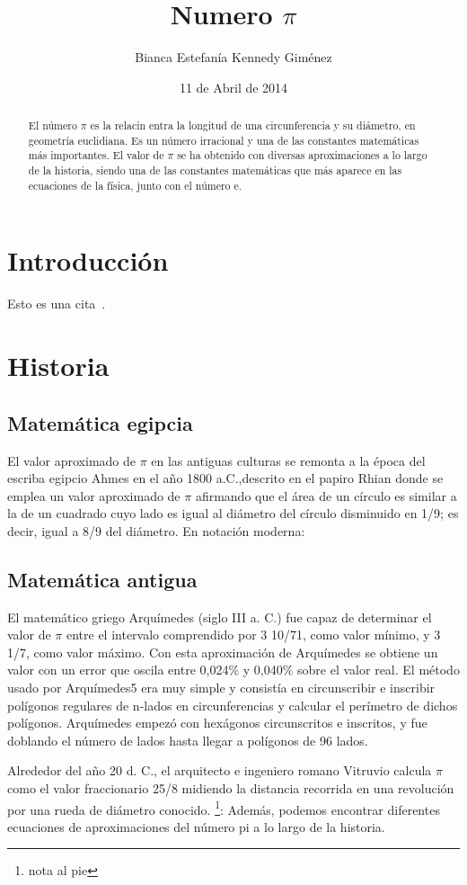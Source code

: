 \documentclass[12pt,a4paper]{article}
\begin{document}
\title{Numero $\pi $}
\author{Bianca Estefanía Kennedy Giménez}
\date{11 de Abril de 2014}
\maketitle

\begin{abstract}
El número $\pi$ es la relacin entra la longitud de una circunferencia y su diámetro, en geometría euclidiana. Es un número irracional y una de las constantes matemáticas más importantes.
El valor de $\pi$ se ha obtenido con diversas aproximaciones a lo largo de la historia, siendo una de las constantes matemáticas que más aparece en las ecuaciones de la física, junto con el número e. 
\end{abstract}

\section{Introducción}
Esto es una cita~\cite{Lamport:LDP94}.

\section{Historia}
\subsection{Matemática egipcia}
El valor aproximado de $\pi$ en las antiguas culturas se remonta a la época del escriba egipcio Ahmes en el año 1800 a.C.,descrito en el papiro Rhian donde se emplea un valor aproximado de $\pi$ afirmando que el área de un círculo es similar a la de un cuadrado cuyo lado es igual al diámetro del círculo disminuido en 1/9; es decir, igual a 8/9 del diámetro. En notación moderna:
\subsection{Matemática antigua}
El matemático griego Arquímedes (siglo III a. C.) fue capaz de determinar el valor de $\pi$ entre el intervalo comprendido por 3 10/71, como valor mínimo, y 3 1/7, como valor máximo. Con esta aproximación de Arquímedes se obtiene un valor con un error que oscila entre 0,024$\%$ y 0,040$\%$ sobre el valor real. El método usado por Arquímedes5 era muy simple y consistía en circunscribir e inscribir polígonos regulares de n-lados en circunferencias y calcular el perímetro de dichos polígonos. Arquímedes empezó con hexágonos circunscritos e inscritos, y fue doblando el número de lados hasta llegar a polígonos de 96 lados.

Alrededor del año 20 d. C., el arquitecto e ingeniero romano Vitruvio calcula $\pi$ como el valor fraccionario 25/8 midiendo la distancia recorrida en una revolución por una rueda de diámetro conocido.
\footnote{nota al pie}:
Además, podemos encontrar diferentes ecuaciones de aproximaciones del número pi a lo largo de la historia.


\end{document}
